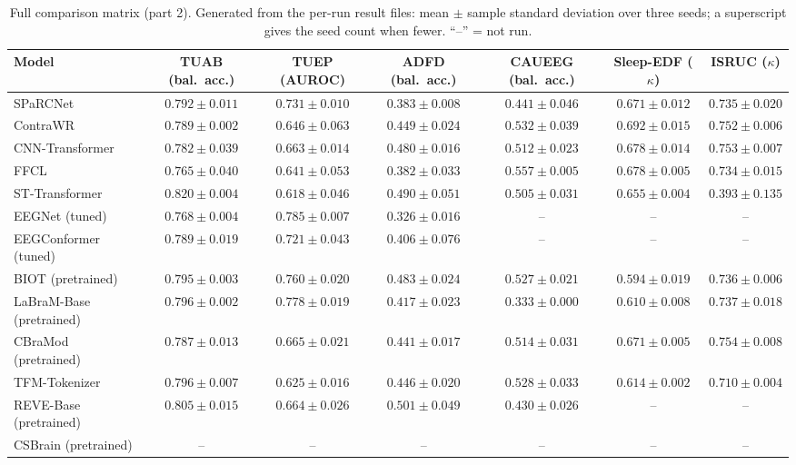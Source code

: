 \begin{table}[h]
\centering
\scriptsize
\caption{Full comparison matrix (part 2). Generated from the per-run result files: mean $\pm$ sample standard deviation over three seeds; a superscript gives the seed count when fewer. ``--'' = not run.}
\begin{tabular}{lcccccc}
\toprule
Model & TUAB (bal.\ acc.) & TUEP (AUROC) & ADFD (bal.\ acc.) & CAUEEG (bal.\ acc.) & Sleep-EDF ($\kappa$) & ISRUC ($\kappa$) \\
\midrule
SPaRCNet & $0.792 \pm 0.011$ & $0.731 \pm 0.010$ & $0.383 \pm 0.008$ & $0.441 \pm 0.046$ & $0.671 \pm 0.012$ & $0.735 \pm 0.020$ \\
ContraWR & $0.789 \pm 0.002$ & $0.646 \pm 0.063$ & $0.449 \pm 0.024$ & $0.532 \pm 0.039$ & $0.692 \pm 0.015$ & $0.752 \pm 0.006$ \\
CNN-Transformer & $0.782 \pm 0.039$ & $0.663 \pm 0.014$ & $0.480 \pm 0.016$ & $0.512 \pm 0.023$ & $0.678 \pm 0.014$ & $0.753 \pm 0.007$ \\
FFCL & $0.765 \pm 0.040$ & $0.641 \pm 0.053$ & $0.382 \pm 0.033$ & $0.557 \pm 0.005$ & $0.678 \pm 0.005$ & $0.734 \pm 0.015$ \\
ST-Transformer & $0.820 \pm 0.004$ & $0.618 \pm 0.046$ & $0.490 \pm 0.051$ & $0.505 \pm 0.031$ & $0.655 \pm 0.004$ & $0.393 \pm 0.135$ \\
EEGNet (tuned) & $0.768 \pm 0.004$ & $0.785 \pm 0.007$ & $0.326 \pm 0.016$ & -- & -- & -- \\
EEGConformer (tuned) & $0.789 \pm 0.019$ & $0.721 \pm 0.043$ & $0.406 \pm 0.076$ & -- & -- & -- \\
BIOT (pretrained) & $0.795 \pm 0.003$ & $0.760 \pm 0.020$ & $0.483 \pm 0.024$ & $0.527 \pm 0.021$ & $0.594 \pm 0.019$ & $0.736 \pm 0.006$ \\
LaBraM-Base (pretrained) & $0.796 \pm 0.002$ & $0.778 \pm 0.019$ & $0.417 \pm 0.023$ & $0.333 \pm 0.000$ & $0.610 \pm 0.008$ & $0.737 \pm 0.018$ \\
CBraMod (pretrained) & $0.787 \pm 0.013$ & $0.665 \pm 0.021$ & $0.441 \pm 0.017$ & $0.514 \pm 0.031$ & $0.671 \pm 0.005$ & $0.754 \pm 0.008$ \\
TFM-Tokenizer & $0.796 \pm 0.007$ & $0.625 \pm 0.016$ & $0.446 \pm 0.020$ & $0.528 \pm 0.033$ & $0.614 \pm 0.002$ & $0.710 \pm 0.004$ \\
REVE-Base (pretrained) & $0.805 \pm 0.015$ & $0.664 \pm 0.026$ & $0.501 \pm 0.049$ & $0.430 \pm 0.026$ & -- & -- \\
CSBrain (pretrained) & -- & -- & -- & -- & -- & -- \\

\end{tabular}
\end{table}

